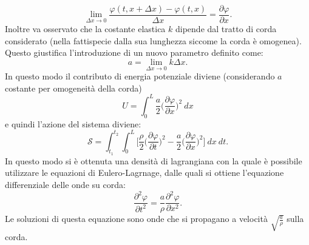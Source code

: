\begin{equation*}
    \lim_{\Delta x\rightarrow 0}\frac{\varphi(t,x+\Delta x)-\varphi(t,x)}{\Delta x}=\frac{\partial \varphi}{\partial x}.
\end{equation*}
Inoltre va osservato che la costante elastica $k$ dipende dal tratto di corda considerato (nella fattispecie dalla sua lunghezza siccome la corda è omogenea). Questo giustifica l'introduzione di un nuovo parametro definito come:
\begin{equation*}
    a=\lim_{\Delta x\rightarrow 0}k\Delta x.
\end{equation*}
In questo modo il contributo di energia potenziale diviene (considerando $a$ costante per omogeneità della corda)
\begin{equation*}
    U=\int_{0}^{L} \frac{a}{2}\bigg(\frac{\partial \varphi}{\partial x}\bigg)^2\ dx
\end{equation*}
e quindi l'azione del sistema diviene:
\begin{equation}
    \mathcal{S} =\int_{t_1}^{t_2}\int_{0}^{L}\bigg[ \frac{\rho}{2}\bigg(\frac{\partial \varphi}{\partial t}\bigg)^2-\frac{a}{2}\bigg(\frac{\partial \varphi}{\partial x}\bigg)^2\bigg]\ dx\ dt.
\end{equation}
In questo modo si è ottenuta una densità di lagrangiana con la quale è possibile utilizzare le equazioni di Eulero-Lagrnage, dalle quali si ottiene l'equazione differenziale delle onde su corda:
\begin{equation*}
    \frac{\partial^2 \varphi}{\partial t^2}=\frac{a}{\rho}\frac{\partial^2 \varphi}{\partial x^2}.
\end{equation*}
Le soluzioni di questa equazione sono onde che si propagano a velocità $\sqrt{\frac{a}{\rho}}$ sulla corda.